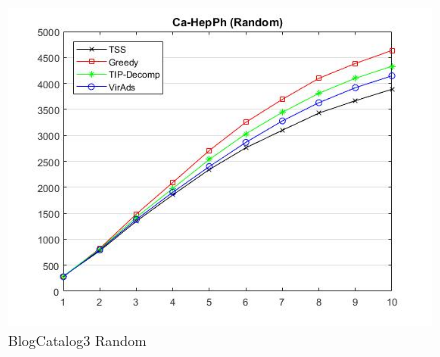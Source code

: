 \begin{figure}
	\centering	
	\includegraphics[scale=0.5]{images/ca-hepphresultrandom.jpg}
	\caption{BlogCatalog3 Random}
\end{figure}

